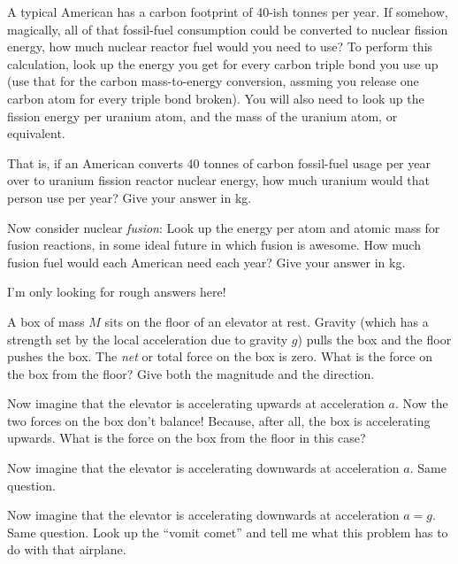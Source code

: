 \documentclass[12pt, letterpaper]{article}
\begin{document}
\begin{problem}
A typical American has a carbon footprint of 40-ish tonnes per year.
If somehow, magically, all of that fossil-fuel consumption could be
converted to nuclear fission energy, how much nuclear reactor fuel
would you need to use? To perform this calculation, look up the energy you
get for every carbon triple bond you use up (use that for the carbon
mass-to-energy conversion, assming you release one carbon atom for
every triple bond broken). You will also need to look up the fission energy
per uranium atom, and the mass of the uranium atom, or equivalent.

That is, if an American converts 40 tonnes of carbon fossil-fuel usage
per year over to uranium fission reactor nuclear energy, how much
uranium would that person use per year? Give your answer in kg.

Now consider nuclear \emph{fusion}: Look up the energy per atom and atomic
mass for fusion reactions, in some ideal future in which fusion is awesome.
How much fusion fuel would each American need each year? Give your answer
in kg.

I'm only looking for rough answers here!
\end{problem}

\begin{problem}
A box of mass $M$ sits on the floor of an elevator at rest. Gravity
(which has a strength set by the local acceleration due to gravity
$g$) pulls the box and the floor pushes the box. The \emph{net} or
total force on the box is zero. What is the force on the box from the
floor? Give both the magnitude and the direction.

Now imagine that the elevator is accelerating upwards at acceleration $a$.
Now the two forces on the box don't balance! Because, after all, the box
is accelerating upwards. What is the force on the box from the floor in this
case?

Now imagine that the elevator is accelerating downwards at acceleration $a$.
Same question.

Now imagine that the elevator is accelerating downwards at acceleration $a = g$.
Same question. Look up the ``vomit comet'' and tell me what this problem has to
do with that airplane.
\end{problem}
\end{document}
